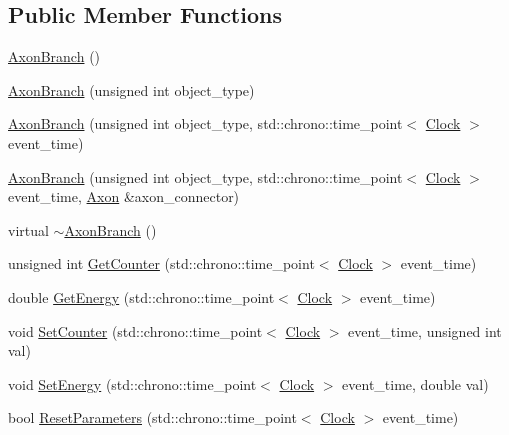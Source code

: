 \subsection*{Public Member Functions}
\begin{DoxyCompactItemize}
\item 
\hyperlink{class_axon_branch_a5bb6ccef8d94c937a85148af932221c0}{Axon\+Branch} ()
\item 
\hyperlink{class_axon_branch_a67618605ac3731556ab48a6583e21ba8}{Axon\+Branch} (unsigned int object\+\_\+type)
\item 
\hyperlink{class_axon_branch_ad6191fcfd8bedc058a4f1cfb5056f5b2}{Axon\+Branch} (unsigned int object\+\_\+type, std\+::chrono\+::time\+\_\+point$<$ \hyperlink{universe_8h_a0ef8d951d1ca5ab3cfaf7ab4c7a6fd80}{Clock} $>$ event\+\_\+time)
\item 
\hyperlink{class_axon_branch_a98f33462edf82dacab750d1140172912}{Axon\+Branch} (unsigned int object\+\_\+type, std\+::chrono\+::time\+\_\+point$<$ \hyperlink{universe_8h_a0ef8d951d1ca5ab3cfaf7ab4c7a6fd80}{Clock} $>$ event\+\_\+time, \hyperlink{class_axon}{Axon} \&axon\+\_\+connector)
\item 
virtual \hyperlink{class_axon_branch_ae4ef4c954b43d084cafb30cf900a1728}{$\sim$\+Axon\+Branch} ()
\item 
unsigned int \hyperlink{class_axon_branch_a1d2404b68ec2d18a814c96a7c04c5fc4}{Get\+Counter} (std\+::chrono\+::time\+\_\+point$<$ \hyperlink{universe_8h_a0ef8d951d1ca5ab3cfaf7ab4c7a6fd80}{Clock} $>$ event\+\_\+time)
\item 
double \hyperlink{class_axon_branch_a688ec51cd5116e9aebe9b4d3c5c7f2b1}{Get\+Energy} (std\+::chrono\+::time\+\_\+point$<$ \hyperlink{universe_8h_a0ef8d951d1ca5ab3cfaf7ab4c7a6fd80}{Clock} $>$ event\+\_\+time)
\item 
void \hyperlink{class_axon_branch_a96ba30b18627563d637d4e02fac943be}{Set\+Counter} (std\+::chrono\+::time\+\_\+point$<$ \hyperlink{universe_8h_a0ef8d951d1ca5ab3cfaf7ab4c7a6fd80}{Clock} $>$ event\+\_\+time, unsigned int val)
\item 
void \hyperlink{class_axon_branch_a6918dcaf6d9325a1a22a2e6c65ad5dab}{Set\+Energy} (std\+::chrono\+::time\+\_\+point$<$ \hyperlink{universe_8h_a0ef8d951d1ca5ab3cfaf7ab4c7a6fd80}{Clock} $>$ event\+\_\+time, double val)
\item 
bool \hyperlink{class_axon_branch_a195d68dffd37317db3f94e1b4c8f73c7}{Reset\+Parameters} (std\+::chrono\+::time\+\_\+point$<$ \hyperlink{universe_8h_a0ef8d951d1ca5ab3cfaf7ab4c7a6fd80}{Clock} $>$ event\+\_\+time)

\end{DoxyCompactItemize}
